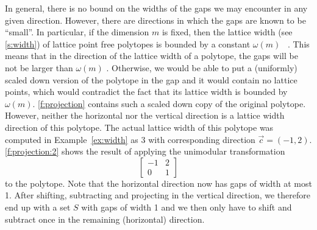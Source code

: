 In general, there is no bound on the widths of the gaps we may
encounter in any given direction.  However, there are directions
in which the gaps are known to be ``small''.
In particular, if the dimension $m$ is fixed, then the lattice width
(see \autoref{s:width}) of lattice point free polytopes
is bounded by a constant $\omega(m)$%
~.
This means that in the direction of the lattice width of a polytope,
the gaps will be not be larger than $\omega(m)$
.
Otherwise, we would be able to put a (uniformly) scaled down version
of the polytope in the gap and it would contain no lattice points,
which would contradict the fact that its lattice width is bounded
by $\omega(m)$.
\autoref{f:projection} contains such a scaled down copy
of the original polytope.  However, neither the horizontal
nor the vertical direction is a lattice width direction
of this polytope.  The actual lattice width of this
polytope was computed in Example~\ref{ex:width} as $3$
with corresponding direction $\vec c = (-1,2)$.
\autoref{f:projection:2} shows the result of applying
the unimodular transformation
$$
\begin{bmatrix}
-1 & 2 \\
0 & 1
\end{bmatrix}
$$
to the polytope.  Note that the horizontal direction
now has gaps of width at most 1.  After shifting, subtracting
and projecting in the vertical direction, we therefore
end up with a set $S$ with gaps of width 1 and we then
only have to shift and subtract once in the remaining
(horizontal) direction.

